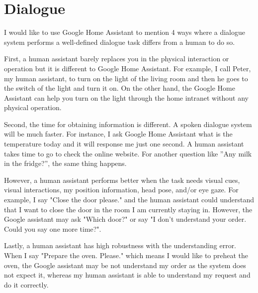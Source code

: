\documentclass[12pt]{article}
\newenvironment{problem}[2][Problem]{\begin{trivlist}
\item[\hskip \labelsep {\bfseries #1}\hskip \labelsep {\bfseries #2.}]}{\end{trivlist}}
\begin{document}
\pagebreak
\section{Dialogue}
\begin{problem}{3.1}
    I would like to use Google Home Assistant to mention 4 ways where a dialogue 
    system performs a well-defined dialogue task differs from a human to do so.

    First, a human assistant barely replaces you in the physical interaction or 
    operation but it is different to Google Home Assistant. 
    For example, I call Peter, my human assistant, to turn on the light of 
    the living room and then he goes to the switch of the light and turn it on. 
    On the other hand, the Google Home Assistant can help you turn on the light 
    through the home intranet without any physical operation. 
    
    Second, the time for obtaining information is different. 
    A spoken dialogue system will be much faster. 
    For instance, I ask Google Home Assistant what is the temperature today and 
    it will response me just one second. 
    A human assistant takes time to go to check the online website. 
    For another question like ”Any milk in the fridge?”, the same thing happens. 
    
    However, a human assistant performs better when the task needs visual cues, 
    visual interactions, my position information, head pose, and/or eye gaze. 
    For example, I say "Close the door please." and the human assistant could 
    understand that I want to close the door in the room I am currently staying in. 
    However, the Google assistant may ask "Which door?" or say 
    "I don’t understand your order. Could you say one more time?".
    
    Lastly, a human assistant has high robustness with the understanding error. 
    When I say "Prepare the oven. Please." which means I would like to preheat 
    the oven, the Google assistant may be not understand my order as the system 
    does not expect it, whereas my human assistant is able to understand 
    my request and do it correctly.
\end{problem}
\end{document}
